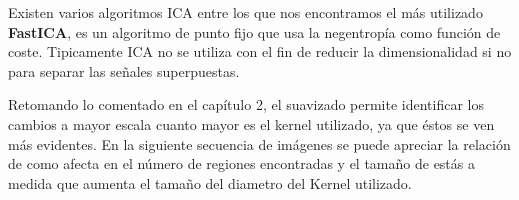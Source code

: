 Existen varios algoritmos ICA entre los que nos encontramos el más utilizado \textbf{FastICA}, es un algoritmo de punto fijo que usa la negentropía como función de coste. Tipicamente ICA no se utiliza con el fin de reducir la dimensionalidad si no para separar las señales superpuestas.

Retomando lo comentado en el capítulo 2, el suavizado permite identificar los cambios a mayor escala cuanto mayor es el kernel utilizado, ya que éstos se ven más evidentes. En la siguiente secuencia de imágenes se puede apreciar la relación de como afecta en el número de regiones encontradas y el tamaño de estás a medida que aumenta el tamaño del diametro del Kernel utilizado.

